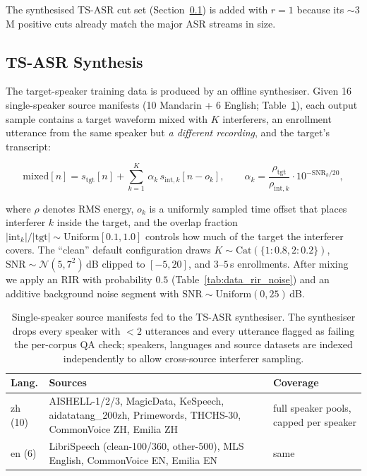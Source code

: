 The synthesised TS-ASR cut set (Section~\ref{subsec:tsasr-synth}) is
added with $r{=}1$ because its $\sim$3\,M positive cuts already match
the major ASR streams in size.

\subsection{TS-ASR Synthesis}
\label{subsec:tsasr-synth}

The target-speaker training data is produced by an offline
synthesiser. Given 16 single-speaker source manifests (10 Mandarin +
6 English; Table~\ref{tab:tsasr_sources}), each output sample contains
a target waveform mixed with $K$ interferers, an enrollment utterance
from the same speaker but \emph{a different recording}, and the
target's transcript:

\begin{equation}
  \mathrm{mixed}[n] = s_\text{tgt}[n] + \sum_{k=1}^{K}\,\alpha_k\,s_{\text{int},k}[n - o_k],
  \qquad
  \alpha_k = \frac{\rho_\text{tgt}}{\rho_{\text{int},k}}\cdot 10^{-\mathrm{SNR}_k/20},
  \label{eq:mixspeakers}
\end{equation}

where $\rho$ denotes RMS energy, $o_k$ is a uniformly sampled time
offset that places interferer $k$ inside the target, and the overlap
fraction $|\text{int}_k|/|\text{tgt}|\!\sim\!\mathrm{Uniform}[0.1, 1.0]$
controls how much of the target the interferer covers. The
``clean'' default configuration draws
$K\!\sim\!\mathrm{Cat}(\{1{:}0.8, 2{:}0.2\})$,
$\mathrm{SNR}\!\sim\!\mathcal{N}(5, 7^2)$\,dB clipped to $[-5, 20]$,
and $3$--$5$\,s enrollments. After mixing we apply an RIR with
probability $0.5$ (Table~\ref{tab:data_rir_noise}) and an additive
background noise segment with $\mathrm{SNR}\!\sim\!\mathrm{Uniform}(0, 25)$\,dB.

\begin{table}[t]
  \caption{Single-speaker source manifests fed to the TS-ASR
    synthesiser. The synthesiser drops every speaker with $<\!2$
    utterances and every utterance flagged as failing the per-corpus
    QA check; speakers, languages and source datasets are indexed
    independently to allow cross-source interferer sampling.}
  \label{tab:tsasr_sources}
  \centering
  \small
  \begin{tabular}{lp{6.0cm}p{3.5cm}}
    \toprule
    Lang. & Sources & Coverage \\
    \midrule
    zh (10) & AISHELL-1/2/3, MagicData, KeSpeech, aidatatang\_200zh, Primewords, THCHS-30, CommonVoice ZH, Emilia ZH & full speaker pools, capped per speaker \\
    en (6)  & LibriSpeech (clean-100/360, other-500), MLS English, CommonVoice EN, Emilia EN & same \\
    \bottomrule
  \end{tabular}
\end{table}

